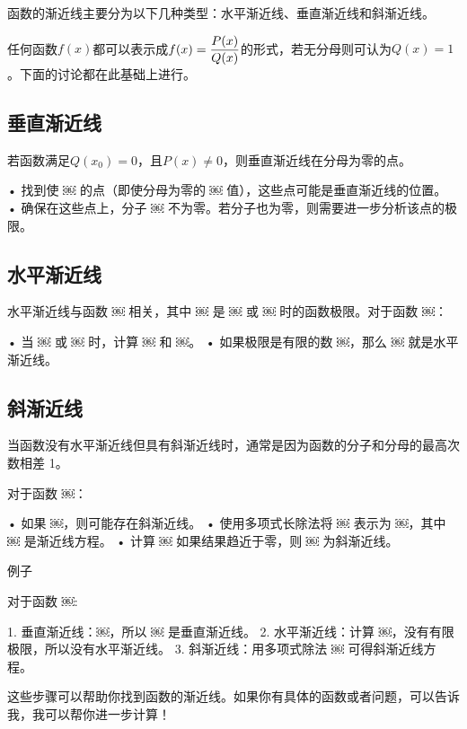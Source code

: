 
函数的渐近线主要分为以下几种类型：水平渐近线、垂直渐近线和斜渐近线。

任何函数$f(x)$都可以表示成$\displaystyle f(x)={P(x)\over Q(x)}$的形式，若无分母则可认为$Q(x)=1$。下面的讨论都在此基础上进行。

\subsection{垂直渐近线}

若函数满足$Q(x_0)=0$，且$P(x)\neq0$，则垂直渐近线在分母为零的点。

	•	找到使 ￼ 的点（即使分母为零的 ￼ 值），这些点可能是垂直渐近线的位置。
	•	确保在这些点上，分子 ￼ 不为零。若分子也为零，则需要进一步分析该点的极限。

\subsection{水平渐近线}

水平渐近线与函数 ￼ 相关，其中 ￼ 是 ￼ 或 ￼ 时的函数极限。对于函数 ￼：

	•	当 ￼ 或 ￼ 时，计算 ￼ 和 ￼。
	•	如果极限是有限的数 ￼，那么 ￼ 就是水平渐近线。

\subsection{斜渐近线}

当函数没有水平渐近线但具有斜渐近线时，通常是因为函数的分子和分母的最高次数相差 1。

对于函数 ￼：

	•	如果 ￼，则可能存在斜渐近线。
	•	使用多项式长除法将 ￼ 表示为 ￼，其中 ￼ 是渐近线方程。
	•	计算 ￼ 如果结果趋近于零，则 ￼ 为斜渐近线。

例子

对于函数 ￼:

	1.	垂直渐近线：￼，所以 ￼ 是垂直渐近线。
	2.	水平渐近线：计算 ￼，没有有限极限，所以没有水平渐近线。
	3.	斜渐近线：用多项式除法 ￼ 可得斜渐近线方程。

这些步骤可以帮助你找到函数的渐近线。如果你有具体的函数或者问题，可以告诉我，我可以帮你进一步计算！